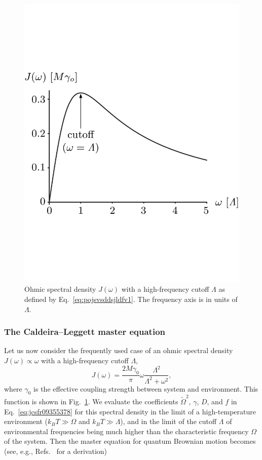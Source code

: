 \documentclass[3p,sort&compress]{elsarticle}
\begin{document}
\begin{figure}
\centering
\includegraphics[scale=0.27]{spectraldens2.pdf}
\caption{Ohmic spectral density $J(\omega)$ with a high-frequency cutoff $\Lambda$ as defined by Eq.~\eqref{eq:pojsvsddsjldfv1}. The frequency axis is in units of $\Lambda$.}
\label{fig:spectraldensity}
\end{figure}

\subsubsection{\label{sec:cald-legg-mast}The Caldeira--Leggett master equation}

Let us now consider the frequently used case of an ohmic spectral density $J(\omega) \propto \omega$ with a high-frequency cutoff $\Lambda$,
%
\begin{equation}
  \label{eq:pojsvsddsjldfv1}
  J(\omega) = \frac{2M\gamma_0}{\pi} \omega
  \frac{\Lambda^2}{\Lambda^2 + \omega^2},
\end{equation}
%
where $\gamma_0$ is the effective coupling strength between  system and  environment. This function is shown in Fig.~\ref{fig:spectraldensity}. We evaluate the coefficients $\widetilde{\Omega}^2$, $\gamma$, $D$, and $f$ in Eq.~\eqref{eq:jcsfr09355378} for this spectral density in the limit of a high-temperature environment ($k_B T \gg \Omega$ and $k_B T \gg \Lambda$), and in the limit of the cutoff $\Lambda$ of environmental frequencies being much higher than the characteristic frequency $\Omega$ of the system. Then the master equation for quantum Brownian motion becomes (see, e.g., Refs.~\cite{Breuer:2002:oq,Schlosshauer:2007:un} for a derivation)
\end{document}
